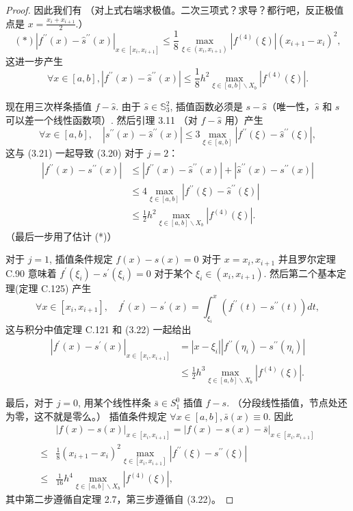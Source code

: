 \documentclass[a4paper]{ctexart}
\begin{document}
{\begin{proof}
因此我们有 （对上式右端求极值。二次三项式？求导？都行吧，反正极值点是 $x = \frac{x_i + x_{i + 1}}{2}$.）
\[
(*) \left|f^{\prime\prime}(x)-\hat{s}^{\prime\prime}(x)\right|_{x\in\left[x_{i}, x_{i+1}\right]}\leq\frac{1}{8}\max_{\xi\in\left(x_{i}, x_{i+1}\right)}\left|f^{(4)}(\xi)\right|\left(x_{i+1}-x_{i}\right)^{2},
\]
这进一步产生
\[
\forall x\in[a, b],\left|f^{\prime\prime}(x)-\hat{s}^{\prime\prime}(x)\right|\leq\frac{1}{8} h^2\max_{\xi\in[a, b]\backslash X_b}\left|f^{(4)}(\xi)\right|.
\]

现在用三次样条插值 $f-\hat{s}$. 由于 $\hat{s}\in \mathbb{S}_{3}^{2}$, 插值函数必须是 $s-\hat{s}$（唯一性，$\hat{s}$ 和 $s$ 可以差一个线性函数项）. 
然后引理 3.11 （对 $f - \hat{s}$ 用）产生
\[
\forall x\in[a, b],\quad\left|s^{\prime\prime}(x)-\hat{s}^{\prime\prime}(x)\right|\leq 3\max_{\xi\in[a, b]}\left|f^{\prime\prime}(\xi)-\hat{s}^{\prime\prime}(\xi)\right|,
\]
这与 (3.21) 一起导致 (3.20) 对于 $j=2$：
\begin{align*}
\left|f^{\prime\prime}(x)-s^{\prime\prime}(x)\right|&\leq\left|f^{\prime\prime}(x)-\hat{s}^{\prime\prime}(x)\right|+\left|\hat{s}^{\prime\prime}(x)-s^{\prime\prime}(x)\right|\\
&\leq 4\max_{\xi\in[a, b]}\left|f^{\prime\prime}(\xi)-\hat{s}^{\prime\prime}(\xi)\right|\\
&\leq\frac{1}{2} h^2\max_{\xi\in[a, b]\backslash X_b}\left|f^{(4)}(\xi)\right|.
\end{align*}
（最后一步用了估计 (*)）


对于 $j=1$, 插值条件规定 $f(x)-s(x)=0$ 对于 $x=x_{i}, x_{i+1}$ 并且罗尔定理 C.90 意味着 
$f^{\prime}\left(\xi_{i}\right)-s^{\prime}\left(\xi_{i}\right)=0$ 对于某个 $\xi_{i}\in\left(x_{i}, x_{i+1}\right)$. 
然后第二个基本定理(定理 C.125) 产生
\[
\forall x\in\left[x_i, x_{i+1}\right],\quad f^{\prime}(x)-s^{\prime}(x)=\int_{\xi_i}^x\left(f^{\prime\prime}(t)-s^{\prime\prime}(t)\right) d t,
\]
这与积分中值定理 C.121 和 (3.22) 一起给出
\begin{align*}
\left|f^{\prime}(x)-s^{\prime}(x)\right|_{x\in\left[x_i, x_{i+1}\right]}&=\left|x-\xi_i\right|\left|f^{\prime\prime}\left(\eta_i\right)-s^{\prime\prime}\left(\eta_i\right)\right|\\
&\leq\frac{1}{2} h^3\max_{\xi\in[a, b]\backslash X_b}\left|f^{(4)}(\xi)\right|.
\end{align*}

最后，对于 $j=0$, 用某个线性样条 $\bar{s}\in S_{1}^{0}$ 插值 $f-s$. （分段线性插值，节点处还为零，这不就是零么。）
插值条件规定 $\forall x\in[a, b],\bar{s}(x)\equiv 0$. 因此
\begin{align*}
&|f(x)-s(x)|_{x\in\left[x_i, x_{i+1}\right]}=\left|f(x)-s(x)-\bar{s}\right|_{x\in\left[x_i, x_{i+1}\right]}\\
\leq&\frac{1}{8}\left(x_{i+1}-x_i\right)^2\max_{\xi\in\left[x_i, x_{i+1}\right]}\left|f^{\prime\prime}(\xi)-s^{\prime\prime}(\xi)\right|\\
\leq&\frac{1}{16} h^4\max_{\xi\in[a, b]\backslash X_b}\left|f^{(4)}(\xi)\right|,
\end{align*}
其中第二步遵循自定理 2.7，第三步遵循自 (3.22)。
\end{proof}

}
\end{document}
